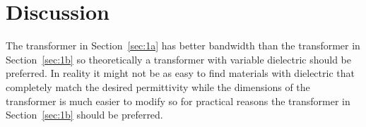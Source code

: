 \documentclass[12pt,a4paper]{article}
\begin{document}
\section{Discussion}
The transformer in Section~\ref{sec:1a} has better bandwidth than the transformer in Section~\ref{sec:1b} so theoretically a transformer with variable dielectric should be preferred. In reality it might not be as easy to find materials with dielectric that completely match the desired permittivity while the dimensions of the transformer is much easier to modify so for practical reasons the transformer in Section~\ref{sec:1b} should be preferred.
\end{document}
